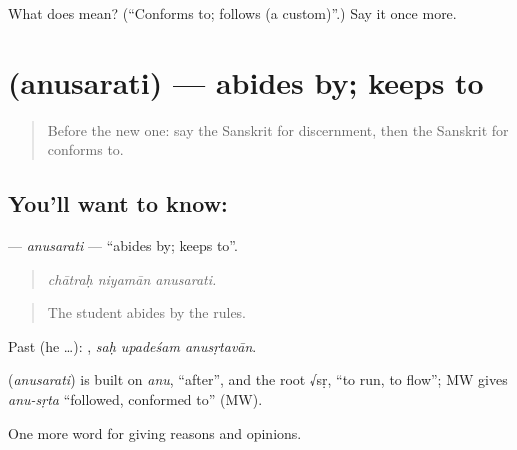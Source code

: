 \begin{tcolorbox}[breakable,colback=teal!4,colframe=teal!35!black,title={Before you move on}]
What does  mean? (\textquotedblleft{}Conforms to; follows (a custom)\textquotedblright{}.) Say it once more.
\end{tcolorbox}
\section[\texorpdfstring{\sk{अनुसरति} (anusarati)}{अनुसरति (anusarati)}]{ (anusarati) — abides by; keeps to}

\label{lesson:SA-C351-anusarati}



\begin{quote}
Before the new one: say the Sanskrit for discernment, then the Sanskrit for conforms to.
\end{quote}

\subsection*{You'll want to know: }
\textbf{} — \emph{anusarati} — \textquotedblleft{}abides by; keeps to\textquotedblright{}.

\begin{quote}
  
\end{quote}

\begin{quote}
\emph{chātraḥ niyamān anusarati.}
\end{quote}

\begin{quote}
The student abides by the rules.
\end{quote}

Past (he …):   , \emph{saḥ upadeśam anusṛtavān}.

\begin{cousinweb}
\textbf{} (\emph{anusarati}) is built on \emph{anu}, \textquotedblleft{}after\textquotedblright{}, and the root √sṛ, \textquotedblleft{}to run, to flow\textquotedblright{}; MW gives \emph{anu-sṛta} \textquotedblleft{}followed, conformed to\textquotedblright{} (MW).
\end{cousinweb}

\begin{grammarlens}[title={What you've built}]
One more word for giving reasons and opinions.
\end{grammarlens}

